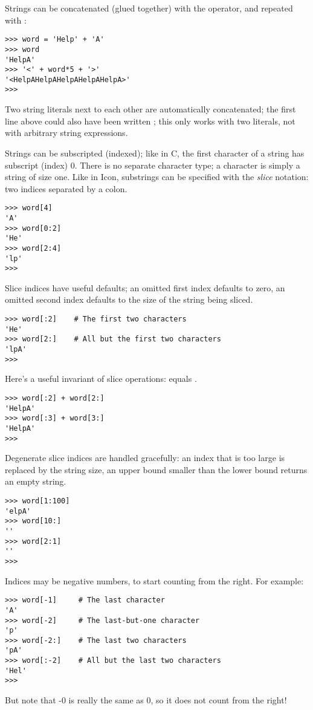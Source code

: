 Strings can be concatenated (glued together) with the \code{+}
operator, and repeated with \code{*}:

\bcode\begin{verbatim}
>>> word = 'Help' + 'A'
>>> word
'HelpA'
>>> '<' + word*5 + '>'
'<HelpAHelpAHelpAHelpAHelpA>'
>>> 
\end{verbatim}\ecode
%
Two string literals next to each other are automatically concatenated;
the first line above could also have been written ; this only works with two literals, not with arbitrary string expressions.

Strings can be subscripted (indexed); like in C, the first character
of a string has subscript (index) 0.  There is no separate character
type; a character is simply a string of size one.  Like in Icon,
substrings can be specified with the \emph{slice} notation: two indices
separated by a colon.

\bcode\begin{verbatim}
>>> word[4]
'A'
>>> word[0:2]
'He'
>>> word[2:4]
'lp'
>>> 
\end{verbatim}\ecode
%
Slice indices have useful defaults; an omitted first index defaults to
zero, an omitted second index defaults to the size of the string being
sliced.

\bcode\begin{verbatim}
>>> word[:2]    # The first two characters
'He'
>>> word[2:]    # All but the first two characters
'lpA'
>>>
\end{verbatim}\ecode
%
Here's a useful invariant of slice operations: 
equals .

\bcode\begin{verbatim}
>>> word[:2] + word[2:]
'HelpA'
>>> word[:3] + word[3:]
'HelpA'
>>> 
\end{verbatim}\ecode
%
Degenerate slice indices are handled gracefully: an index that is too
large is replaced by the string size, an upper bound smaller than the
lower bound returns an empty string.

\bcode\begin{verbatim}
>>> word[1:100]
'elpA'
>>> word[10:]
''
>>> word[2:1]
''
>>> 
\end{verbatim}\ecode
%
Indices may be negative numbers, to start counting from the right.
For example:

\bcode\begin{verbatim}
>>> word[-1]     # The last character
'A'
>>> word[-2]     # The last-but-one character
'p'
>>> word[-2:]    # The last two characters
'pA'
>>> word[:-2]    # All but the last two characters
'Hel'
>>>
\end{verbatim}\ecode
%
But note that -0 is really the same as 0, so it does not count from
the right!

